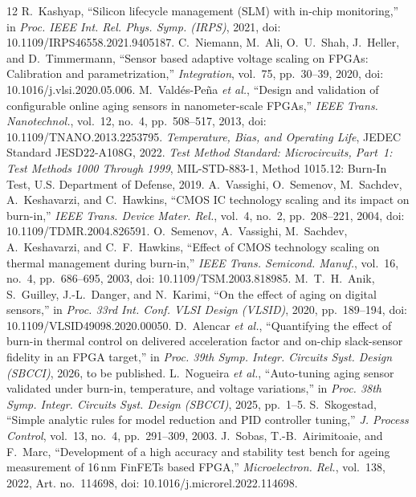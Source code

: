 \documentclass[10pt,twocolumn]{article}
\begin{document}
\renewcommand{\refname}{References}\begin{thebibliography}{12}
\footnotesize
 R.~Kashyap, ``Silicon lifecycle management (SLM) with in-chip monitoring,'' in \emph{Proc. IEEE Int. Rel. Phys. Symp. (IRPS)}, 2021, doi: 10.1109/IRPS46558.2021.9405187.
 C.~Niemann, M.~Ali, O.~U.~Shah, J.~Heller, and D.~Timmermann, ``Sensor based adaptive voltage scaling on FPGAs: Calibration and parametrization,'' \emph{Integration}, vol.~75, pp.~30--39, 2020, doi: 10.1016/j.vlsi.2020.05.006.
 M.~Vald\'es-Pe\~na \emph{et al.}, ``Design and validation of configurable online aging sensors in nanometer-scale FPGAs,'' \emph{IEEE Trans. Nanotechnol.}, vol.~12, no.~4, pp.~508--517, 2013, doi: 10.1109/TNANO.2013.2253795.
 \emph{Temperature, Bias, and Operating Life}, JEDEC Standard JESD22-A108G, 2022.
 \emph{Test Method Standard: Microcircuits, Part~1: Test Methods 1000 Through 1999}, MIL-STD-883-1, Method 1015.12: Burn-In Test, U.S. Department of Defense, 2019.
 A.~Vassighi, O.~Semenov, M.~Sachdev, A.~Keshavarzi, and C.~Hawkins, ``CMOS IC technology scaling and its impact on burn-in,'' \emph{IEEE Trans. Device Mater. Rel.}, vol.~4, no.~2, pp.~208--221, 2004, doi: 10.1109/TDMR.2004.826591.
 O.~Semenov, A.~Vassighi, M.~Sachdev, A.~Keshavarzi, and C.~F.~Hawkins, ``Effect of CMOS technology scaling on thermal management during burn-in,'' \emph{IEEE Trans. Semicond. Manuf.}, vol.~16, no.~4, pp.~686--695, 2003, doi: 10.1109/TSM.2003.818985.
 M.~T.~H.~Anik, S.~Guilley, J.-L.~Danger, and N.~Karimi, ``On the effect of aging on digital sensors,'' in \emph{Proc. 33rd Int. Conf. VLSI Design (VLSID)}, 2020, pp.~189--194, doi: 10.1109/VLSID49098.2020.00050.
 D.~Alencar \emph{et al.}, ``Quantifying the effect of burn-in thermal control on delivered acceleration factor and on-chip slack-sensor fidelity in an FPGA target,'' in \emph{Proc. 39th Symp. Integr. Circuits Syst. Design (SBCCI)}, 2026, to be published.
 L.~Nogueira \emph{et al.}, ``Auto-tuning aging sensor validated under burn-in, temperature, and voltage variations,'' in \emph{Proc. 38th Symp. Integr. Circuits Syst. Design (SBCCI)}, 2025, pp.~1--5.
 S.~Skogestad, ``Simple analytic rules for model reduction and PID controller tuning,'' \emph{J. Process Control}, vol.~13, no.~4, pp.~291--309, 2003.
 J.~Sobas, T.-B.~Airimitoaie, and F.~Marc, ``Development of a high accuracy and stability test bench for ageing measurement of 16\,nm FinFETs based FPGA,'' \emph{Microelectron. Rel.}, vol.~138, 2022, Art. no.~114698, doi: 10.1016/j.microrel.2022.114698.
\end{thebibliography}
\end{document}

